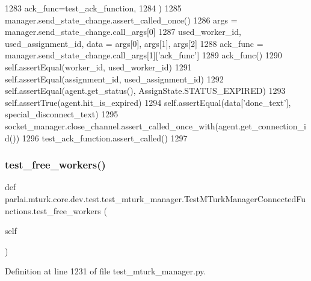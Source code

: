 \begin{DoxyCode}
1283             ack\_func=test\_ack\_function,
1284         )
1285         manager.send\_state\_change.assert\_called\_once()
1286         args = manager.send\_state\_change.call\_args[0]
1287         used\_worker\_id, used\_assignment\_id, data = args[0], args[1], args[2]
1288         ack\_func = manager.send\_state\_change.call\_args[1][\textcolor{stringliteral}{'ack\_func'}]
1289         ack\_func()
1290         self.assertEqual(worker\_id, used\_worker\_id)
1291         self.assertEqual(assignment\_id, used\_assignment\_id)
1292         self.assertEqual(agent.get\_status(), AssignState.STATUS\_EXPIRED)
1293         self.assertTrue(agent.hit\_is\_expired)
1294         self.assertEqual(data[\textcolor{stringliteral}{'done\_text'}], special\_disconnect\_text)
1295         socket\_manager.close\_channel.assert\_called\_once\_with(agent.get\_connection\_id())
1296         test\_ack\_function.assert\_called()
1297 
\end{DoxyCode}
\mbox{\label{classparlai_1_1mturk_1_1core_1_1dev_1_1test_1_1test__mturk__manager_1_1TestMTurkManagerConnectedFunctions_abe4ad6d598ea29fcecf8b75d0c5213e9}} 
\subsubsection{\texorpdfstring{test\+\_\+free\+\_\+workers()}{test\_free\_workers()}}
{\footnotesize\ttfamily def parlai.\+mturk.\+core.\+dev.\+test.\+test\+\_\+mturk\+\_\+manager.\+Test\+M\+Turk\+Manager\+Connected\+Functions.\+test\+\_\+free\+\_\+workers (\begin{DoxyParamCaption}\item[{}]{self }\end{DoxyParamCaption})}



Definition at line 1231 of file test\+\_\+mturk\+\_\+manager.\+py.


